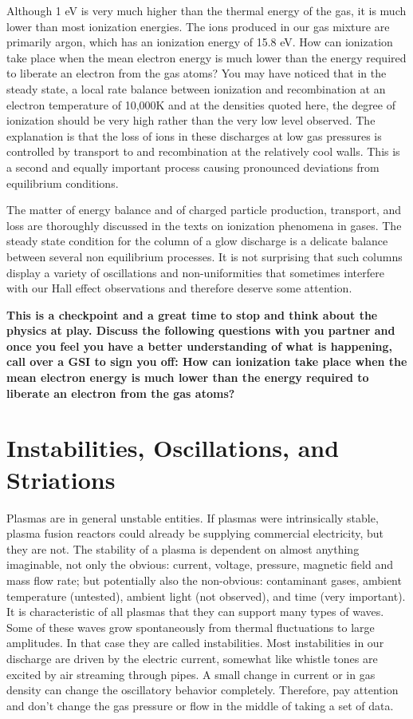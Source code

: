\documentclass{../lab}
\begin{document}
\newpage

Although 1 eV is very much higher than the thermal energy of the gas, it is much lower than most ionization energies. The ions produced in our gas mixture are primarily argon, which has an ionization energy of 15.8 eV. How can ionization take place when the mean electron energy is much lower than the energy required to liberate an electron from the gas atoms? You may have noticed that in the steady state, a local rate balance between ionization and recombination at an electron temperature of 10,000K and at the densities quoted here, the degree of ionization should be very high rather than the very low level observed. The explanation is that the loss of ions in these discharges at low gas pressures is controlled by transport to and recombination at the relatively cool walls. This is a second and equally important process causing pronounced deviations from equilibrium conditions.

The matter of energy balance and of charged particle production, transport, and loss are thoroughly discussed in the texts on ionization phenomena in gases. The steady state condition for the column of a glow discharge is a delicate balance between several non equilibrium processes. It is not surprising that such columns display a variety of oscillations and non-uniformities that sometimes interfere with our Hall effect observations and therefore deserve some attention.

\textbf{This is a checkpoint and a great time to stop and think about the physics at play. Discuss the following questions with you partner and once you feel you have a better understanding of what is happening, call over a GSI to sign you off:
How can ionization take place when the mean electron energy is much lower than the energy required to liberate an electron from the gas atoms?}

\section{Instabilities, Oscillations, and Striations}

Plasmas are in general unstable entities. If plasmas were intrinsically stable, plasma fusion reactors could already be supplying commercial electricity, but they are not. The stability of a plasma is dependent on almost anything imaginable, not only the obvious: current, voltage, pressure, magnetic field and mass flow rate; but potentially also the non-obvious: contaminant gases, ambient temperature (untested), ambient light (not observed), and time (very important). It is characteristic of all plasmas that they can support many types of waves. Some of these waves grow spontaneously from thermal fluctuations to large amplitudes. In that case they are called instabilities. Most instabilities in our discharge are driven by the electric current, somewhat like whistle tones are excited by air streaming through pipes. A small change in current or in gas density can change the oscillatory behavior completely. Therefore, pay attention and don’t change the gas pressure or flow in the middle of taking a set of data.
\end{document}
